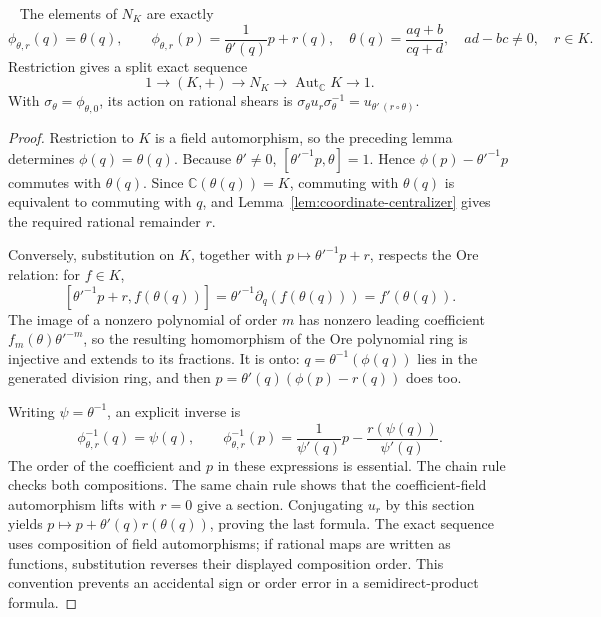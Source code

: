 \begin{proposition}\ours\ 
\label{prop:coordinate-normalizer}
The elements of \(N_K\) are exactly
\[
 \phi_{\theta,r}(q)=\theta(q),\qquad
 \phi_{\theta,r}(p)=\frac{1}{\theta'(q)}p+r(q),
 \quad \theta(q)=\frac{aq+b}{cq+d},\quad ad-bc\ne0,\quad r\in K.
\]
Restriction gives a split exact sequence
\[
 1\longrightarrow (K,+)\longrightarrow N_K
 \longrightarrow\operatorname{Aut}_{\mathbb C}K\longrightarrow1.
\]
With \(\sigma_\theta=\phi_{\theta,0}\), its action on rational shears is
\(\sigma_\theta u_r\sigma_\theta^{-1}=u_{\theta'\,(r\circ\theta)}\).
\end{proposition}
\begin{proof}
Restriction to \(K\) is a field automorphism, so the preceding lemma
determines \(\phi(q)=\theta(q)\). Because \(\theta'\ne0\),
\([\theta'^{-1}p,\theta]=1\). Hence
\(\phi(p)-\theta'^{-1}p\) commutes with \(\theta(q)\). Since
\(\mathbb C(\theta(q))=K\), commuting with \(\theta(q)\) is equivalent
to commuting with \(q\), and Lemma~\ref{lem:coordinate-centralizer}
gives the required rational remainder \(r\).

Conversely, substitution on \(K\), together with
\(p\mapsto\theta'^{-1}p+r\), respects the Ore relation: for \(f\in K\),
\[
 [\theta'^{-1}p+r,f(\theta(q))]
   =\theta'^{-1}\partial_q(f(\theta(q)))=f'(\theta(q)).
\]
The image of a nonzero polynomial of order \(m\) has nonzero leading
coefficient \(f_m(\theta)\theta'^{-m}\), so the resulting homomorphism
of the Ore polynomial ring is injective and extends to its fractions.
It is onto: \(q=\theta^{-1}(\phi(q))\) lies in the generated division
ring, and then \(p=\theta'(q)(\phi(p)-r(q))\) does too.

Writing \(\psi=\theta^{-1}\), an explicit inverse is
\[
 \phi_{\theta,r}^{-1}(q)=\psi(q),\qquad
 \phi_{\theta,r}^{-1}(p)=\frac{1}{\psi'(q)}p
                       -\frac{r(\psi(q))}{\psi'(q)}.
\]
The order of the coefficient and \(p\) in these expressions is essential.
The chain rule checks both compositions. The same chain rule shows that
the coefficient-field automorphism lifts with \(r=0\) give a section.
Conjugating \(u_r\) by this section yields
\(p\mapsto p+\theta'(q)r(\theta(q))\), proving the last formula.
The exact sequence uses composition of field automorphisms; if rational
maps are written as functions, substitution reverses their displayed
composition order. This convention prevents an accidental sign or order
error in a semidirect-product formula.
\end{proof}

